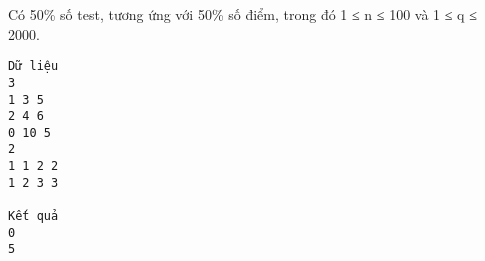 Có 50\% số test, tương ứng với 50\% số điểm, trong đó 1 ≤ n ≤ 100 và 1 ≤ q ≤ 2000.
\begin{verbatim}
Dữ liệu
3 
1 3 5
2 4 6
0 10 5
2
1 1 2 2
1 2 3 3

Kết quả
0
5
\end{verbatim}